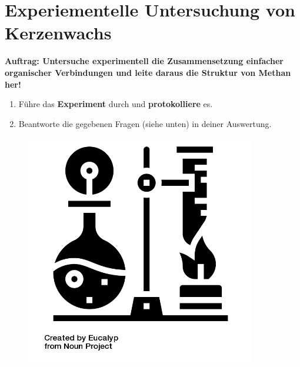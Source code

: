 \documentclass{scrartcl}  %
\begin{document}
\newpage	
	\section{Experiementelle Untersuchung von Kerzenwachs}
			
		\noindent \textbf{Auftrag: Untersuche experimentell die Zusammensetzung einfacher organischer Verbindungen und leite daraus die Struktur von Methan her!}
		
		\begin{enumerate}
			\item Führe das \textbf{Experiment} durch und \textbf{protokolliere} es.
			\item Beantworte die gegebenen Fragen (siehe unten) in deiner Auswertung.
		\end{enumerate}
		
		\begin{tcolorbox}[enhanced,
			colback=white,
			colframe=green!30!black,
			fonttitle=\sffamily\bfseries\large, 
			title=Durchführung,
			attach boxed title to top left={xshift=3.2mm,yshift=-0.50mm},
			boxed title style={skin=enhancedfirst jigsaw,size=small,arc=1mm,bottom=-1mm,colframe=green!50!black,height=0.75cm},
			colbacktitle=green!50!black,
			drop lifted shadow]
			\begin{figure}  
				\centering
				\vspace{-14pt}  %
				\includegraphics[width=0.9\textwidth]{../symbols/symbol_tex_method}
			\end{figure}
			

\end{tcolorbox}
\end{document}
